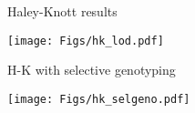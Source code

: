 \documentclass[12pt]{article}
\newcommand{\headsize}{\fontsize{35}{35} \selectfont}
\begin{document}
\newpage

\headsize \color{myyellow}
\hfill \begin{minipage}{5.75in}
\centering
Haley-Knott results
\end{minipage}

\vfill

\centerline{\texttt{[image: Figs/hk\_lod.pdf]}}



\newpage

\headsize \color{myyellow}
\hfill \begin{minipage}{5.75in}
\centering
H-K with selective genotyping
\end{minipage}

\vfill

\centerline{\texttt{[image: Figs/hk\_selgeno.pdf]}}
\end{document}
